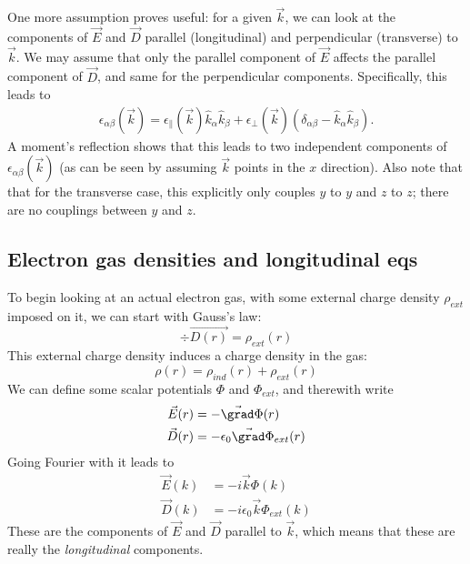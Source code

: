 \documentclass[../../main.tex]{subfiles}
\begin{document}
One more assumption proves useful: for a given $\vec{k}$, we can look at the components of $\vec{E}$ and $\vec{D}$ parallel (longitudinal) and perpendicular (transverse) to $\vec{k}$. We may assume  that only the parallel component of $\vec{E}$ affects the parallel component of $\vec{D}$, and same for the perpendicular components. Specifically, this leads to 
\begin{align}
	\epsilon_{\alpha \beta}(\vec{k}) = \epsilon_{\parallel}(\vec{k}) \hat{k}_\alpha \hat{k}_\beta + \epsilon_{\perp}(\vec{k}) (\delta_{\alpha \beta} - \hat{k}_\alpha \hat{k}_\beta).
\end{align}
A moment's reflection shows that this leads to two independent components of $\epsilon_{\alpha \beta}(\vec{k})$ (as can be seen by assuming $\vec{k}$ points in the $x$ direction). Also note that that for the transverse case, this explicitly only couples $y$ to $y$ and $z$ to $z$; there are no couplings between $y$ and $z$.

\subsection{Electron gas densities and longitudinal eqs}
To begin looking at an actual electron gas, with some external charge density $\rho_{ext}$ imposed on it, we can start with Gauss's law:
\begin{equation}
	\div\vec{D(r)} = \rho_{ext}(r)
\end{equation}
This external charge density induces a charge density in the gas:
\begin{equation}
	\rho(r) = \rho_{ind}(r) + \rho_{ext}(r)
\end{equation}
We can define some scalar potentials $\Phi$ and $\Phi_{ext}$, and therewith write
\begin{align}
	\vec{E}(r) &= - \vec{\grad} \Phi(r) \\
	\vec{D}(r) &= - \epsilon_0 \vec{\grad} \Phi_{ext}(r)
\end{align}
Going Fourier with it leads to 
\begin{align}
	\vec{E}(k) &= - i \vec{k} \Phi(k) \\
	\vec{D}(k) &= - i \epsilon_0 \vec{k} \Phi_{ext}(k)
\end{align}
These are the components of $\vec{E}$ and $\vec{D}$ parallel to $\vec{k}$, which means that these are really the \emph{longitudinal} components. 
\end{document}
